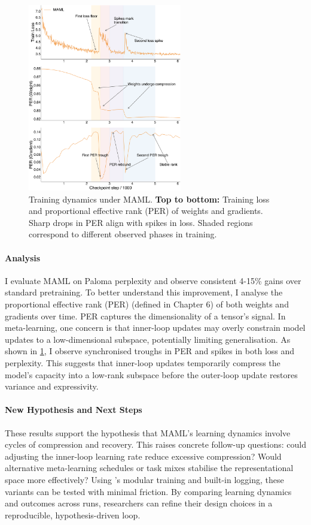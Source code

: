 \begin{figure}[h!]
    \centering
    \includegraphics[width=0.6\textwidth]{chapters/pico/figures/maml-example.pdf}
    \caption{Training dynamics under MAML.
    \textbf{Top to bottom:} Training loss and proportional effective rank (PER) of weights and gradients.
    Sharp drops in PER align with spikes in loss. Shaded regions correspond to different observed phases in training. 
    }
    \label{fig:maml_example}
\end{figure}


\paragraph{Analysis} I evaluate MAML on Paloma perplexity and observe consistent 4-15\% gains over standard pretraining. To better understand this improvement, I analyse the proportional effective rank (PER) (defined in Chapter 6) of both weights and gradients over time. PER captures the dimensionality of a tensor's signal. In meta-learning, one concern is that inner-loop updates may overly constrain model updates to a low-dimensional subspace, potentially limiting generalisation. As shown in \cref{fig:maml_example}, I observe synchronised troughs in PER and spikes in both loss and perplexity. This suggests that inner-loop updates temporarily compress the model's capacity into a low-rank subspace before the outer-loop update restores variance and expressivity.


\paragraph{New Hypothesis and Next Steps}
These results support the hypothesis that MAML's learning dynamics involve cycles of compression and recovery. This raises concrete follow-up questions: could adjusting the inner-loop learning rate reduce excessive compression? Would alternative meta-learning schedules or task mixes stabilise the representational space more effectively? Using \pico's modular training and built-in logging, these variants can be tested with minimal friction. By comparing learning dynamics and outcomes across runs, researchers can refine their design choices in a reproducible, hypothesis-driven loop.%

